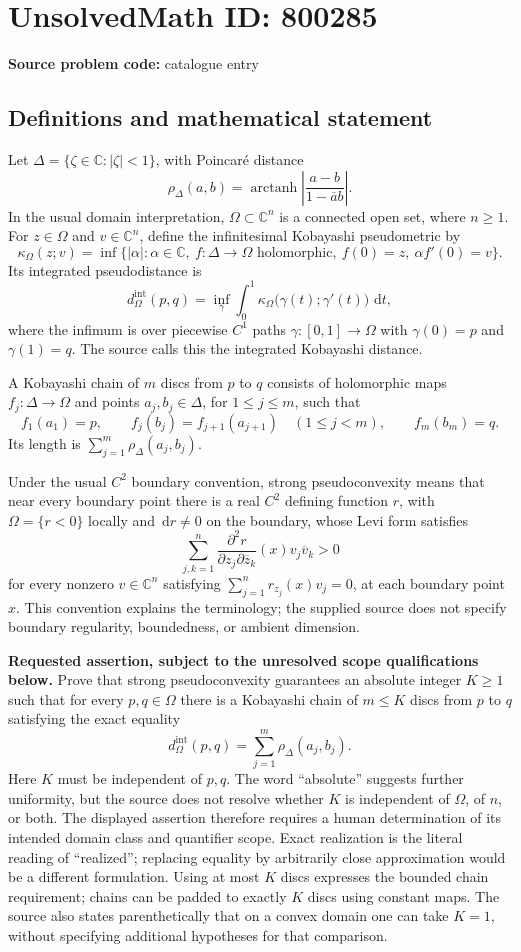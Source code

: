 \documentclass[11pt]{article}
\newcommand{\C}{\mathbb{C}}
\newcommand{\dd}{\,\mathrm{d}}
\begin{document}
\section*{UnsolvedMath ID: 800285}
\textbf{Source problem code:} catalogue entry
\subsection{Definitions and mathematical statement}
Let \(\Delta=\{\zeta\in\C:|\zeta|<1\}\), with Poincar\'e distance
\[
\rho_\Delta(a,b)=\operatorname{arctanh}\left|\frac{a-b}{1-\overline a b}\right|.
\]
In the usual domain interpretation, \(\Omega\subset\C^n\) is a connected open set, where \(n\geq1\). For \(z\in\Omega\) and \(v\in\C^n\), define the infinitesimal Kobayashi pseudometric by
\[
\kappa_\Omega(z;v)=\inf\{ |\alpha|:\alpha\in\C,\ f:\Delta\to\Omega\text{ holomorphic},\ f(0)=z,\ \alpha f'(0)=v\}.
\]
Its integrated pseudodistance is
\[
d_\Omega^{\mathrm{int}}(p,q)=\inf_\gamma\int_0^1\kappa_\Omega\bigl(\gamma(t);\gamma'(t)\bigr)\,\dd t,
\]
where the infimum is over piecewise \(C^1\) paths \(\gamma:[0,1]\to\Omega\) with \(\gamma(0)=p\) and \(\gamma(1)=q\). The source calls this the integrated Kobayashi distance.

A Kobayashi chain of \(m\) discs from \(p\) to \(q\) consists of holomorphic maps \(f_j:\Delta\to\Omega\) and points \(a_j,b_j\in\Delta\), for \(1\leq j\leq m\), such that
\[
f_1(a_1)=p,\qquad f_j(b_j)=f_{j+1}(a_{j+1})\quad(1\leq j<m),\qquad f_m(b_m)=q.
\]
Its length is \(\sum_{j=1}^m\rho_\Delta(a_j,b_j)\).

Under the usual \(C^2\) boundary convention, strong pseudoconvexity means that near every boundary point there is a real \(C^2\) defining function \(r\), with \(\Omega=\{r<0\}\) locally and \(\dd r\ne0\) on the boundary, whose Levi form satisfies
\[
\sum_{j,k=1}^n\frac{\partial^2 r}{\partial z_j\partial\overline z_k}(x)v_j\overline v_k>0
\]
for every nonzero \(v\in\C^n\) satisfying \(\sum_{j=1}^n r_{z_j}(x)v_j=0\), at each boundary point \(x\). This convention explains the terminology; the supplied source does not specify boundary regularity, boundedness, or ambient dimension.

\textbf{Requested assertion, subject to the unresolved scope qualifications below.} Prove that strong pseudoconvexity guarantees an absolute integer \(K\geq1\) such that for every \(p,q\in\Omega\) there is a Kobayashi chain of \(m\leq K\) discs from \(p\) to \(q\) satisfying the exact equality
\[
d_\Omega^{\mathrm{int}}(p,q)=\sum_{j=1}^m\rho_\Delta(a_j,b_j).
\]
Here \(K\) must be independent of \(p,q\). The word ``absolute'' suggests further uniformity, but the source does not resolve whether \(K\) is independent of \(\Omega\), of \(n\), or both. The displayed assertion therefore requires a human determination of its intended domain class and quantifier scope. Exact realization is the literal reading of ``realized''; replacing equality by arbitrarily close approximation would be a different formulation. Using at most \(K\) discs expresses the bounded chain requirement; chains can be padded to exactly \(K\) discs using constant maps. The source also states parenthetically that on a convex domain one can take \(K=1\), without specifying additional hypotheses for that comparison.
\end{document}
